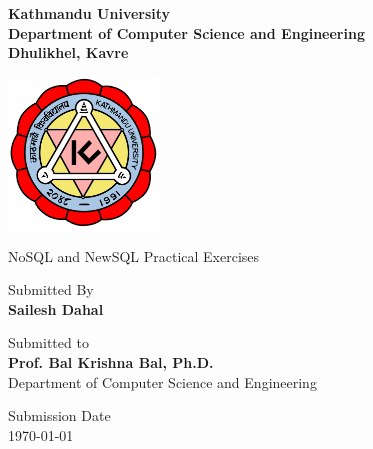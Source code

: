 \documentclass[12pt,a4paper]{report}
\begin{document}

\begin{titlepage}
  \centering

  \vspace*{1cm}

  {\Large\bfseries Kathmandu University\\
    Department of Computer Science and Engineering\\
    Dhulikhel, Kavre}

  \vspace{1.5cm}

  \includegraphics[width=0.3\textwidth]{ku-logo.png}

  \vspace{1.5cm}

  {\large NoSQL and NewSQL Practical Exercises}

  \vspace{1cm}
  {\large Submitted By\\
    \textbf{Sailesh Dahal}}

  \vspace{1.5cm}

  {\large Submitted to\\
    \textbf{Prof. Bal Krishna Bal, Ph.D.}\\
    Department of Computer Science and Engineering}

  \vspace{1.5cm}

  {\large Submission Date\\
    \today}

  \vfill

\end{titlepage}

\tableofcontents
\clearpage
{}
\setcounter{page}{1}













\nocite{chatgpt_gpt4o_2025,claude-sonnet-4}
\printbibliography

\appendix


\end{document}
